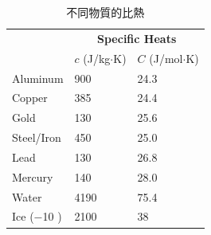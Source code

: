 \begin{enumerate}[a. ]
			\begin{table}[H]
 			\centering
    		\caption{不同物質的比熱}\label{ex_SpecHeat}
	    	\renewcommand{\arraystretch}{1.2}	
			\arrayrulewidth=1pt	
			\tabcolsep=12pt 
				\begin{tabular}{@{\HC }lll@{}} 
				\hline & \multicolumn{2}{c}{\bf Specific Heats} \\ 
				\cline{2-3}  & $c$ (J/kg$\cdot$K) & $C$ (J/mol$\cdot$K) \\ 
				\hline 
				Aluminum & 900 & 24.3 \\ 
				Copper & 385 & 24.4 \\ 
				Gold & 130 & 25.6 \\ 
				Steel/Iron & 450 & 25.0 \\ 
				Lead & 130 & 26.8 \\ 
				Mercury & 140 & 28.0 \\ 
				Water & 4190 & 75.4 \\ 
				Ice ($-$10 \textcelsius) & 2100 & 38 \\ 
				\hline 
				\end{tabular}
			\end{table}
\end{enumerate}



